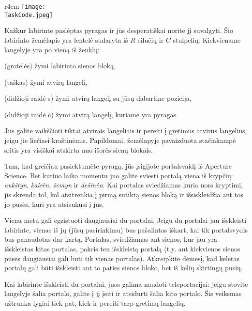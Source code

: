 \documentclass{boi2014-lt}
\renewcommand{\TaskCode}{portals}
\newcommand{\constant}[1]{{\tt #1}}
\begin{document}
    \begin{wrapfigure}[3]{r}{4cm}
        \vspace{-24pt}
		\texttt{[image: \\TaskCode.jpeg]}
	\end{wrapfigure}

    Kažkur labirinte paslėptas pyragas ir jūs desperatiškai norite jį suvalgyti.
    Šio labirinto žemėlapis yra lentelė sudaryta iš $R$ eilučių ir $C$ stulpelių.
    Kiekviename langelyje yra po vieną iš ženklų:
    \begin{description}[itemindent=1pt]
    	\item[\constant{\#}] (grotelės) žymi labirinto sienos bloką,
        \item[\constant{.}] (taškas) žymi atvirą langelį,
        \item[\constant{S}] (didžioji raidė s) žymi atvirą langelį su jūsų
            dabartine pozicija,
        \item[\constant{C}] (didžioji raidė c) žymi atvirą langelį, kuriame yra
            pyragas.
    \end{description}

    Jūs galite vaikščioti tiktai atvirais langeliais ir pereiti į gretimus
    atvirus langelius, jeigu jie liečiasi kraštinėmis. Papildomai, žemėlapyje
    pavaizduota stačiakampė sritis yra visiškai atskirta nuo išorės sienų
    blokais.

    Tam, kad greičiau pasiektumėte pyragą, jūs įsigijote portalsvaidį iš
    Aperture Science\texttrademark{}. Bet kuriuo laiko momentu juo galite sviesti
    portalą viena iš krypčių: \emph{aukštyn}, \emph{kairėn}, \emph{žemyn} ir
    \emph{dešinėn}. Kai portalas sviedžiamas kuria nors kryptimi, jis skrenda
    tol, kol atsitrenkia į pirmą sutiktą sienos bloką ir išsiskleidžia ant tos jo
    pusės, kuri yra atsisukusi į jus.

    Vienu metu gali egzistuoti daugiausiai du portalai. Jeigu du portalai jau
    išskleisti labirinte, vienas iš jų (jūsų pasirinkimu) bus pašalintas iškart,
    kai tik portalsvydis bus panaudotas dar kartą. Portalas, sviedžiamas ant
    sienos, kur jau yra išskleistas kitas portalas, pakeis ten išskleistą portalą
    (t.y. ant kiekvienos sienos pusės daugiausiai gali būti tik vienas portalas).
    Atkreipkite dėmesį, kad keletas portalų gali būti išskleisti ant to paties
    sienos bloko, bet iš kelių skirtingų pusių.

    Kai labirinte išskleisti du portalai, juos galima naudoti teleportacijai:
    jeigu stovite langelyje šalia portalo, galite į jį įeiti ir atsidurti šalia
    kito portalo. Šis veiksmas užtrunka lygiai tiek pat, kiek ir pereiti tarp
    gretimų langelių.
\end{document}
